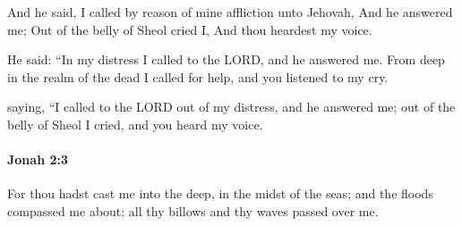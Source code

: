 			\begin{versebox}
					\item[BHS] 
					\item[LXX] 
					\item[ASV] And he said, I called by reason of mine affliction unto Jehovah, And he answered me; Out of the belly of Sheol cried I, And thou heardest my voice.
					\item[NIV] He said: “In my distress I called to the LORD, and he answered me. From deep in the realm of the dead I called for help, and you listened to my cry.
					\item[NRSV] saying, “I called to the LORD out of my distress, and he answered me; out of the belly of Sheol I cried, and you heard my voice.
			\end{versebox}

		\paragraph{Jonah 2:3} %
			\label{JONAH-2-3}

			For thou hadst cast me into the deep, in the midst of the seas; and the floods compassed me about: all thy billows and thy waves passed over me.

